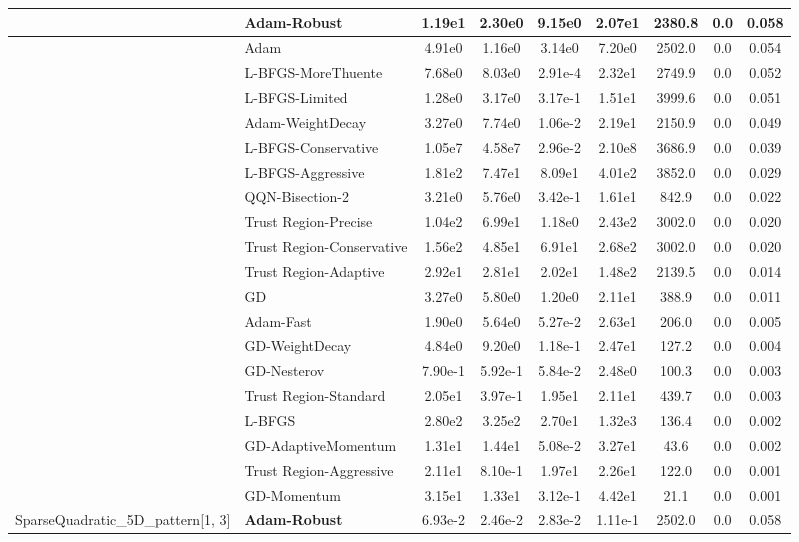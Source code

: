 \documentclass[10pt]{article}
\begin{document}
\begin{longtable}{|l|l|c|c|c|c|c|c|c|}
\hline
 & Adam-Robust & 1.19e1 & 2.30e0 & 9.15e0 & 2.07e1 & 2380.8 & 0.0 & 0.058 \\
\hline
 & Adam & 4.91e0 & 1.16e0 & 3.14e0 & 7.20e0 & 2502.0 & 0.0 & 0.054 \\
\hline
 & L-BFGS-MoreThuente & 7.68e0 & 8.03e0 & 2.91e-4 & 2.32e1 & 2749.9 & 0.0 & 0.052 \\
\hline
 & L-BFGS-Limited & 1.28e0 & 3.17e0 & 3.17e-1 & 1.51e1 & 3999.6 & 0.0 & 0.051 \\
\hline
 & Adam-WeightDecay & 3.27e0 & 7.74e0 & 1.06e-2 & 2.19e1 & 2150.9 & 0.0 & 0.049 \\
\hline
 & L-BFGS-Conservative & 1.05e7 & 4.58e7 & 2.96e-2 & 2.10e8 & 3686.9 & 0.0 & 0.039 \\
\hline
 & L-BFGS-Aggressive & 1.81e2 & 7.47e1 & 8.09e1 & 4.01e2 & 3852.0 & 0.0 & 0.029 \\
\hline
 & QQN-Bisection-2 & 3.21e0 & 5.76e0 & 3.42e-1 & 1.61e1 & 842.9 & 0.0 & 0.022 \\
\hline
 & Trust Region-Precise & 1.04e2 & 6.99e1 & 1.18e0 & 2.43e2 & 3002.0 & 0.0 & 0.020 \\
\hline
 & Trust Region-Conservative & 1.56e2 & 4.85e1 & 6.91e1 & 2.68e2 & 3002.0 & 0.0 & 0.020 \\
\hline
 & Trust Region-Adaptive & 2.92e1 & 2.81e1 & 2.02e1 & 1.48e2 & 2139.5 & 0.0 & 0.014 \\
\hline
 & GD & 3.27e0 & 5.80e0 & 1.20e0 & 2.11e1 & 388.9 & 0.0 & 0.011 \\
\hline
 & Adam-Fast & 1.90e0 & 5.64e0 & 5.27e-2 & 2.63e1 & 206.0 & 0.0 & 0.005 \\
\hline
 & GD-WeightDecay & 4.84e0 & 9.20e0 & 1.18e-1 & 2.47e1 & 127.2 & 0.0 & 0.004 \\
\hline
 & GD-Nesterov & 7.90e-1 & 5.92e-1 & 5.84e-2 & 2.48e0 & 100.3 & 0.0 & 0.003 \\
\hline
 & Trust Region-Standard & 2.05e1 & 3.97e-1 & 1.95e1 & 2.11e1 & 439.7 & 0.0 & 0.003 \\
\hline
 & L-BFGS & 2.80e2 & 3.25e2 & 2.70e1 & 1.32e3 & 136.4 & 0.0 & 0.002 \\
\hline
 & GD-AdaptiveMomentum & 1.31e1 & 1.44e1 & 5.08e-2 & 3.27e1 & 43.6 & 0.0 & 0.002 \\
\hline
 & Trust Region-Aggressive & 2.11e1 & 8.10e-1 & 1.97e1 & 2.26e1 & 122.0 & 0.0 & 0.001 \\
\hline
 & GD-Momentum & 3.15e1 & 1.33e1 & 3.12e-1 & 4.42e1 & 21.1 & 0.0 & 0.001 \\
SparseQuadratic\_5D\_pattern[1, 3] & \textbf{Adam-Robust} & 6.93e-2 & 2.46e-2 & 2.83e-2 & 1.11e-1 & 2502.0 & 0.0 & 0.058 \\

\end{longtable}
\end{document}
